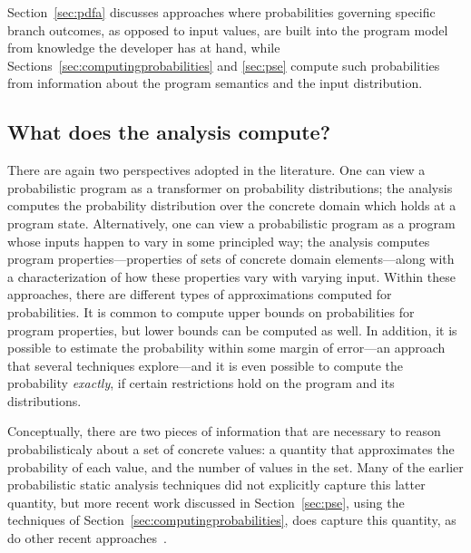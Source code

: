Section~\ref{sec:pdfa} discusses approaches where probabilities
governing specific branch outcomes, as opposed to input values,
are built into the program model from knowledge the developer
has at hand, while Sections~\ref{sec:computingprobabilities}
and \ref{sec:pse} compute such probabilities from information about
the program semantics and the input distribution.

\subsection{What does the analysis compute?}
There are again two perspectives adopted in the literature.
One can view a probabilistic program as a transformer on probability
distributions; the analysis computes the probability distribution over the
concrete domain which holds at a program state.
Alternatively, one can view a probabilistic program as a program 
whose inputs happen
to vary in some principled way; the analysis computes program 
properties---properties of sets of concrete domain elements---along with a characterization
of how these properties vary with varying input.
Within these approaches, there are different types of approximations
computed for probabilities.  It is common to compute upper bounds
on probabilities for program properties, but lower bounds can 
be computed as well.  In addition, it is possible to estimate the
probability within some margin of error---an approach that several
techniques explore---and it is even possible to compute the probability
\textit{exactly}, if certain restrictions hold on the program and its distributions.

Conceptually, there are two pieces of information that are necessary
to reason probabilisticaly about a set of concrete values: a quantity
that approximates the probability of each value, and the number of
values in the set.  Many of the earlier probabilistic static analysis
techniques did not explicitly capture this latter quantity, but
more recent work discussed in Section~\ref{sec:pse}, using the
techniques of Section~\ref{sec:computingprobabilities}, 
does capture this quantity, as do other
recent approaches~\cite{mardziel2013dynamic}.



